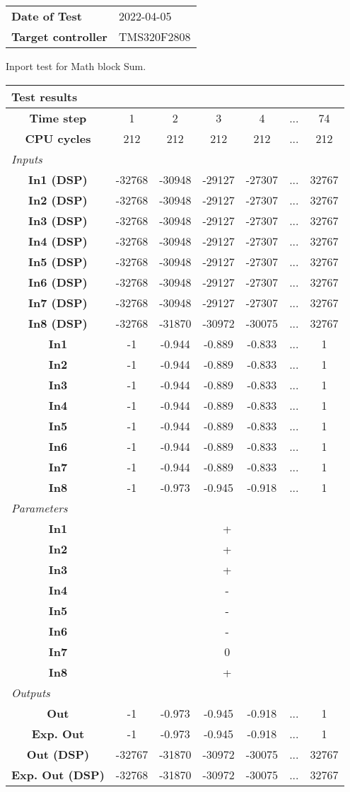 \begin{tabular}{l l}
\textbf{Date of Test} & 2022-04-05 \tabularnewline
\textbf{Target controller} & TMS320F2808 \tabularnewline
\end{tabular}
\vspace{1ex}
Inport test for Math block Sum.

\vspace{1em}
\begin{tabularx}{\textwidth}{|c|c|c|c|c|>{\centering\arraybackslash}X|c|}
\hline
\multicolumn{7}{|l|}{\cellcolor[gray]{0.8}\textbf{Test results}} \tabularnewline \hline
\textbf{Time step} & 1 & 2 & 3 & 4 & ... & 74 \tabularnewline \hline
\textbf{CPU cycles} & 212 & 212 & 212 & 212 & ... & 212 \tabularnewline \hline
\multicolumn{7}{|l|}{\cellcolor[gray]{0.9}\textit{Inputs}} \tabularnewline \hline
\textbf{In1 (DSP)} & -32768 & -30948 & -29127 & -27307 & ... & 32767 \tabularnewline \hline
\textbf{In2 (DSP)} & -32768 & -30948 & -29127 & -27307 & ... & 32767 \tabularnewline \hline
\textbf{In3 (DSP)} & -32768 & -30948 & -29127 & -27307 & ... & 32767 \tabularnewline \hline
\textbf{In4 (DSP)} & -32768 & -30948 & -29127 & -27307 & ... & 32767 \tabularnewline \hline
\textbf{In5 (DSP)} & -32768 & -30948 & -29127 & -27307 & ... & 32767 \tabularnewline \hline
\textbf{In6 (DSP)} & -32768 & -30948 & -29127 & -27307 & ... & 32767 \tabularnewline \hline
\textbf{In7 (DSP)} & -32768 & -30948 & -29127 & -27307 & ... & 32767 \tabularnewline \hline
\textbf{In8 (DSP)} & -32768 & -31870 & -30972 & -30075 & ... & 32767 \tabularnewline \hline
\textbf{In1} & -1 & -0.944 & -0.889 & -0.833 & ... & 1 \tabularnewline \hline
\textbf{In2} & -1 & -0.944 & -0.889 & -0.833 & ... & 1 \tabularnewline \hline
\textbf{In3} & -1 & -0.944 & -0.889 & -0.833 & ... & 1 \tabularnewline \hline
\textbf{In4} & -1 & -0.944 & -0.889 & -0.833 & ... & 1 \tabularnewline \hline
\textbf{In5} & -1 & -0.944 & -0.889 & -0.833 & ... & 1 \tabularnewline \hline
\textbf{In6} & -1 & -0.944 & -0.889 & -0.833 & ... & 1 \tabularnewline \hline
\textbf{In7} & -1 & -0.944 & -0.889 & -0.833 & ... & 1 \tabularnewline \hline
\textbf{In8} & -1 & -0.973 & -0.945 & -0.918 & ... & 1 \tabularnewline \hline
\multicolumn{7}{|l|}{\cellcolor[gray]{0.9}\textit{Parameters}} \tabularnewline \hline
\textbf{In1} & \multicolumn{6}{c|}{+} \tabularnewline \hline
\textbf{In2} & \multicolumn{6}{c|}{+} \tabularnewline \hline
\textbf{In3} & \multicolumn{6}{c|}{+} \tabularnewline \hline
\textbf{In4} & \multicolumn{6}{c|}{-} \tabularnewline \hline
\textbf{In5} & \multicolumn{6}{c|}{-} \tabularnewline \hline
\textbf{In6} & \multicolumn{6}{c|}{-} \tabularnewline \hline
\textbf{In7} & \multicolumn{6}{c|}{0} \tabularnewline \hline
\textbf{In8} & \multicolumn{6}{c|}{+} \tabularnewline \hline
\multicolumn{7}{|l|}{\cellcolor[gray]{0.9}\textit{Outputs}} \tabularnewline \hline
\textbf{Out} & -1 & -0.973 & -0.945 & -0.918 & ... & 1 \tabularnewline \hline
\textbf{Exp. Out} & -1 & -0.973 & -0.945 & -0.918 & ... & 1 \tabularnewline \hline
\textbf{Out (DSP)} & -32767 & -31870 & -30972 & -30075 & ... & 32767 \tabularnewline \hline
\textbf{Exp. Out (DSP)} & -32768 & -31870 & -30972 & -30075 & ... & 32767 \tabularnewline \hline
\end{tabularx}
